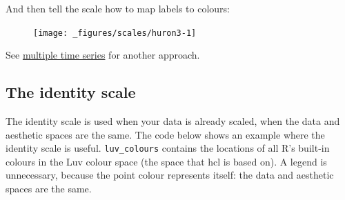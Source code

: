 And then tell the scale how to map labels to colours:

\begin{Shaded}
\begin{Highlighting}[]
\StringTok{  }\NormalTok{(}\NormalTok{(} \StringTok{ }\NormalTok{, } \NormalTok{)) +}\StringTok{ }
\StringTok{  }\NormalTok{(}\NormalTok{(} \StringTok{ }\NormalTok{, } \NormalTok{)) +}\StringTok{ }
\StringTok{  }\NormalTok{(}\NormalTok{, }
     \NormalTok{(} \NormalTok{=}\NormalTok{, } \NormalTok{=}\NormalTok{)}
  \NormalTok{)}
\end{Highlighting}
\end{Shaded}

\begin{figure}[H]
  \centering
  \texttt{[image: \_figures/scales/huron3-1]}
\end{figure}

See \hyperref[sec:spread-gather]{multiple time series} for another
approach.

\subsection{The identity scale}\label{sub:scale-identity}

The identity scale is used when your data is already scaled, when the
data and aesthetic spaces are the same. The code below shows an example
where the identity scale is useful. \texttt{luv\_colours} contains the
locations of all R's built-in colours in the Luv colour space (the space
that hcl is based on). A legend is unnecessary, because the point colour
represents itself: the data and aesthetic spaces are the same.
 

